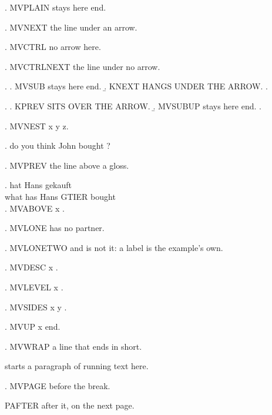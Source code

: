 \ex. MVPLAIN  stays here  end.

\ex. MVNEXT the line under an arrow.

\ex. MVCTRL no arrow here.

\ex. MVCTRLNEXT the line under no arrow.

\ex. \a. MVSUB  stays here  end.
     \b. KNEXT HANGS UNDER THE ARROW.
     \z.

\ex. \a. KPREV SITS OVER THE ARROW.
     \b. MVSUBUP  stays here  end.
     \z.

\ex. MVNEST   x  y  z.

\ex.  do you think  John bought
     ?

\ex. MVPREV the line above a gloss.

\ex. \gll {} hat Hans  gekauft\\
          what has Hans GTIER bought\\

\ex. MVABOVE  x .

\ex. MVLONE  has no partner.

\ex. MVLONETWO and  is not it: a label is the example's own.

\ex. MVDESC  x .

\ex. MVLEVEL  x .

\ex. MVSIDES   x  y
     .

\ex. MVUP  x  end.

\ex. MVWRAP a line that ends in \linebreak
      short.

 starts a paragraph of running text  here.

\ex. MVPAGE  before the break.\par
\newpage
     PAFTER after it,  on the next page.

